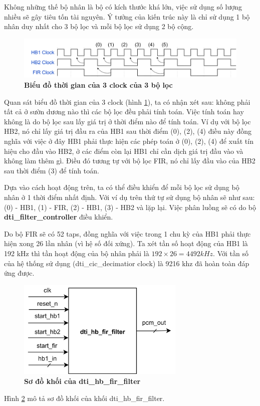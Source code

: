 Không những thế bộ nhân là bộ có kích thước khá lớn, việc sử dụng số lượng nhiều sẽ gây tiêu tốn tài nguyên. Ý tưởng của kiến trúc này là chỉ sử dụng 1 bộ nhân duy nhất cho 3 bộ lọc và mỗi bộ lọc sử dụng 2 bộ cộng.

\begin{figure}[H]
    \centering
    \includegraphics[width=16cm]{Images/Chuong4/hb_fir/timing.png}
    \caption[Biểu đồ thời gian của 3 clock của 3 bộ lọc]{\bfseries \fontsize{12pt}{0pt}\selectfont Biểu đồ thời gian của 3 clock của 3 bộ lọc}
    \label{3clock}
\end{figure}

Quan sát biểu đồ thời gian của 3 clock (hình \ref{3clock}), ta có nhận xét sau: không phải tất cả ở sườn dương nào thì các bộ lọc đều phải tính toán. Việc tính toán hay không là do bộ lọc sau lấy giá trị ở thời điểm nào để tính toán. Ví dụ với bộ lọc HB2, nó chỉ lấy giá trị đầu ra của HB1 sau thời điểm (0), (2), (4) điều này đồng nghĩa với việc ở đây HB1 phải thực hiện các phép toán ở (0), (2), (4) để xuất tín hiệu cho đầu vào HB2, ở các điểm còn lại HB1 chỉ cần dịch giá trị đầu vào và không làm thêm gì. Điều đó tương tự với bộ lọc FIR, nó chỉ lấy đầu vào của HB2  sau thời điểm (3) để tính toán.

Dựa vào cách hoạt động trên, ta có thể  điều khiển để mỗi bộ lọc sử dụng bộ nhân ở 1 thời điểm nhất định. Với ví dụ trên thứ tự sử dụng bộ nhân sẽ như sau: (0) - HB1, (1) - FIR, (2) - HB1, (3) - HB2 và lặp lại. Việc phân luồng sẽ có do bộ \textbf{dti\_filter\_controller} điều khiển.

Do bộ FIR sẽ có 52 taps, đồng nghĩa với việc trong 1 chu kỳ của HB1 phải thực hiện xong 26 lần nhân (vì hệ số đối xứng). Ta xét tần số hoạt động của HB1 là 192 kHz thì tần hoạt động của bộ nhân phải là $192 \times 26 = 4492 kHz$. Với tần số của hệ thống sử dụng (dti\_cic\_decimatior clock) là 9216 khz đã hoàn toàn đáp ứng được.

\begin{figure}[H]
    \centering
    \includegraphics[width=8cm]{Images/Chuong4/hb_fir/hb_fir_top.png}
    \caption[Sơ đồ khối của dti\_cic\_decimator]{\bfseries \fontsize{12pt}{0pt}\selectfont Sơ đồ khối của dti\_hb\_fir\_filter}
    \label{hb_fir_top}
\end{figure}
Hình \ref{hb_fir_top} mô tả sơ đồ khối của khối dti\_hb\_fir\_filter.

